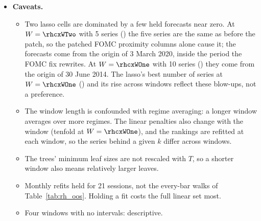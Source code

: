 \begin{itemize}
  $W = \rhcxWOne$, \rhcxWTwo, \rhcxWMain{} and \rhcxWLong{} has $k^\ast = \rhcxKstarLgbmBarOne$, \rhcxKstarLgbmBarTwo,
  \rhcxKstarLgbmBarMain, \rhcxKstarLgbmBarLong{} series for LightGBM (it \rhcxKstarReadLgbmBar), \rhcxKstarXgbBarOne,
  \rhcxKstarXgbBarTwo, \rhcxKstarXgbBarMain, \rhcxKstarXgbBarLong{} for XGBoost (\rhcxKstarReadXgbBar),
  \rhcxKstarRidgeBarOne, \rhcxKstarRidgeBarTwo, \rhcxKstarRidgeBarMain, \rhcxKstarRidgeBarLong{} for ridge
  (\rhcxKstarReadRidgeBar), \rhcxKstarLassoBarOne, \rhcxKstarLassoBarTwo, \rhcxKstarLassoBarMain,
  \rhcxKstarLassoBarLong{} for the lasso (\rhcxKstarReadLassoBar) and \rhcxKstarEnetBarOne, \rhcxKstarEnetBarTwo,
  \rhcxKstarEnetBarMain, \rhcxKstarEnetBarLong{} for the elastic net (\rhcxKstarReadEnetBar).
  \begin{itemize}
  \item The dense-and-weak prediction, a best number of series that rises with the window, holds on every bar for
    \rhcxWhoKstarRisesBar{} and at the 16:00 bar for \rhcxWhoKstarRisesClose.
  \end{itemize}
\item \textbf{Caveats.}
  \begin{itemize}
  \item Two lasso cells are dominated by a few held forecasts near zero. At $W = \rhcxWTwo$ with 5 series
    (\rhcxGainLassoBarTwoFive) the five series are the same as before the patch, so the patched FOMC proximity columns
    alone cause it; the forecasts come from the origin of 3 March 2020, inside the period the FOMC fix rewrites. At
    $W = \rhcxWOne$ with 10 series (\rhcxGainLassoBarOneTen) they come from the origin of 30 June 2014. The lasso's best
    number of series at $W = \rhcxWOne$ (\rhcxKstarLassoBarOne) and its rise across windows reflect these blow-ups, not
    a preference.
  \item The window length is confounded with regime averaging: a longer window averages over more regimes. The
    linear penalties also change with the window (tenfold at $W = \rhcxWOne$), and the rankings are refitted at each
    window, so the series behind a given $k$ differ across windows.
  \item The trees' minimum leaf sizes are not rescaled with $T$, so a shorter window also means relatively larger
    leaves.
  \item Monthly refits held for 21 sessions, not the every-bar walks of Table~\ref{tab:rh_oos}. Holding a fit costs
    the full linear set most.
  \item Four windows with no intervals: descriptive.
  \end{itemize}
\end{itemize}

